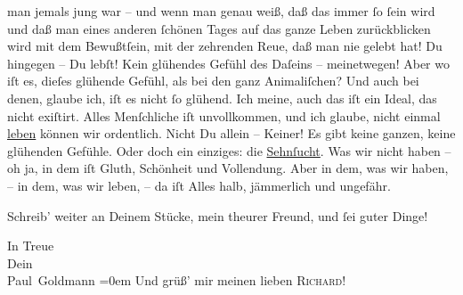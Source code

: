                man jemals jung war – und wenn man genau weiß, daß das immer{ }ſo{ }ſein wird und daß man
               eines  anderen{ }ſchönen Tages auf das {\pb}ganze Leben zurückblicken wird mit dem Bewußtſein,
               mit der zehrenden Reue, daß man nie gelebt hat! Du hingegen – Du lebſt! Kein
               glühendes Gefühl des Daſeins – meinetwegen! Aber wo iſt es, dieſes glühende Gefühl,
               als bei den ganz Animaliſchen? Und auch bei denen, glaube ich, iſt es nicht{ }ſo
               glühend. Ich meine, auch das iſt ein Ideal, das nicht exiſtirt. Alles Menſchliche iſt
                   unvollkommen, und ich glaube, nicht einmal {\pb}\uline{leben} können wir ordentlich. Nicht Du allein –
               Keiner! Es gibt keine ganzen, keine glühenden Gefühle. Oder doch\strikeout{,} ein einziges: die \uline{Sehnſucht}. Was wir nicht haben – oh ja, in dem iſt Gluth, Schönheit und
               Vollendung. Aber in dem, was wir haben, – in dem, was wir leben, – da iſt Alles halb,
               jämmerlich und ungefähr.\pend
           
\pstart
           {\pb}Schreib’ weiter an Deinem Stücke, mein theurer Freund,
               und{ }ſei guter Dinge!\pend
           
\pstart
           In Treue {\\[\baselineskip]}Dein {\\[\baselineskip]}\spacefill\mbox{Paul Goldmann}\pend
           \leftskip=0em{}
\pstart
           \noindent{}Und grüß’ mir meinen lieben \textsc{Richard}!\pend
           \endnumbering{}  \newcommand{\dateiname}{L02765}\newcommand{\titel}{Paul Goldmann an Arthur Schnitzler, 23. 1. [1896]}\newcommand{\editorInnen}{Martin Anton Müller und Laura Untner}
